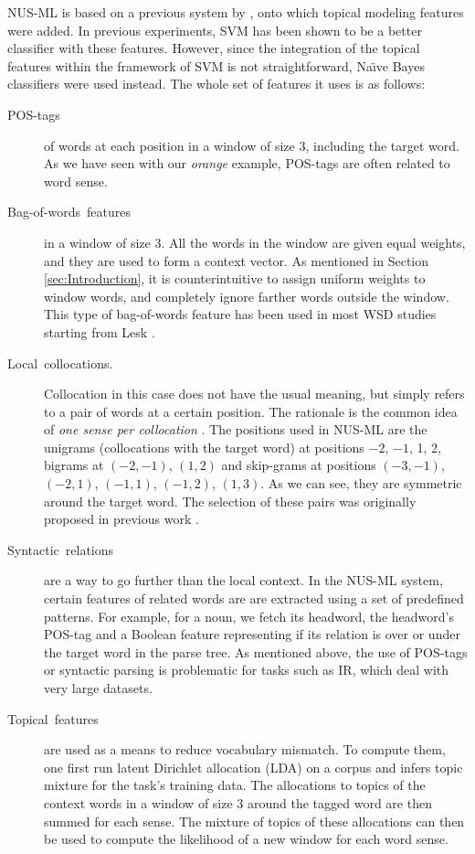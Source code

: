 \documentclass[english]{jnlp_1.4}
\begin{document}
NUS-ML is based on a previous system by \cite{LeeNg2002WSD}, onto
which topical modeling features were added. In previous experiments,
SVM has been shown to be a better classifier with these features.
However, since the integration of the topical features within the
framework of SVM is not straightforward, Na\"{\i}ve Bayes classifiers
were used instead. The whole set of features it uses is as follows:
\begin{description}
\item [{POS-tags}] of words at each position in a window of size 3, including
the target word. As we have seen with our \emph{orange }example, POS-tags
are often related to word sense. 
\item [{Bag-of-words~features}] in a window of size 3. All the words in
the window are given equal weights, and they are used to form a context
vector. As mentioned in Section \ref{sec:Introduction}, it is counterintuitive
to assign uniform weights to window words, and completely ignore farther
words outside the window. This type of bag-of-words feature has been
used in most WSD studies starting from Lesk \cite{LeskAlgo}.
\item [{Local~collocations.}] Collocation in this case does not have the
usual meaning, but simply refers to a pair of words at a certain position.
The rationale is the common idea of \emph{one sense per collocation}
\cite{YarowskyOneSenseCollocation}. The positions used in NUS-ML
are the unigrams (collocations with the target word) at positions
$-2$, $-1$, 1, 2, bigrams at $(-2,-1)$, $(1,2)$ and skip-grams
at positions $(-3,-1)$, $(-2,1)$, $(-1,1)$, $(-1,2)$,
$(1,3)$. As we can see, they are symmetric around the target
word. The selection of these pairs was originally proposed in previous
work \cite{NgLeeExemplarWSD,NgExemplarImprovements}. 
\item [{Syntactic~relations}] are a way to go further than the local context.
In the NUS-ML system, certain features of related words are are extracted
using a set of predefined patterns. For example, for a noun, we fetch
its headword, the headword's POS-tag and a Boolean feature representing
if its relation is over or under the target word in the parse tree.
As mentioned above, the use of POS-tags or syntactic parsing is problematic
for tasks such as IR, which deal with very large datasets.
\item [{Topical~features}] are used as a means to reduce vocabulary mismatch.
To compute them, one first run latent Dirichlet allocation (LDA) \cite{Blei03latentdirichlet}
on a corpus and infers topic mixture for the task's training data.
The allocations to topics of the context words in a window of size
3 around the tagged word are then summed for each sense. The mixture
of topics of these allocations can then be used to compute the likelihood
of a new window for each word sense.
\end{description}
\end{document}

